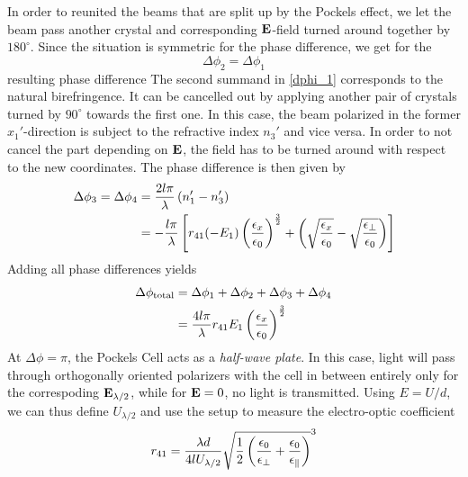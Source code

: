 In order to reunited the beams that are split up by the Pockels effect, 
we let the beam pass another crystal and corresponding $\mathbf{E}$-field 
turned around together by $180^\circ$. 
Since the situation is symmetric for the phase difference, we get for the 
\begin{equation}
    \Delta \phi_2 = \Delta \phi_1
\end{equation}
resulting phase difference  
The second summand in \eqref{dphi_1} corresponds to the natural birefringence. 
It can be cancelled out by applying another pair of crystals turned by 
$90^\circ$ towards the first one. In this case, the beam polarized 
in the former $x_1'$-direction is subject to the refractive index 
$n_3'$ and vice versa. In order to not cancel the part depending on $\mathbf{E}$, 
the field has to be turned around with respect to the new coordinates. 
The phase difference is then given by 
\begin{equation}
    \begin{split}
    \Delta \phi_3 = \Delta \phi_4
    &= \frac{2l \pi}{\lambda} \left(n_1' - n_3' \right) \\
    &= -\frac{l \pi}{\lambda}\left[
    r_{41} (-E_1) \left(\frac{\epsilon_x}{\epsilon_0}\right)^\frac{3}{2} + 
    \left(\sqrt{\frac{\epsilon_x}{\epsilon_0}} - \sqrt{\frac{\epsilon_\perp}{\epsilon_0}}
    \right)
    \right]
   \end{split}
    \label{eq:dphi_34}
\end{equation}
Adding all phase differences yields
\begin{equation}
    \begin{split}
    \Delta \phi_\mathrm{total}  
    &= \Delta \phi_1 + \Delta \phi_2 + \Delta \phi_3 + \Delta \phi_4 \\
    &= \frac{4l \pi}{\lambda} r_{41} E_1 \left(\frac{\epsilon_x}{\epsilon_0}\right)^\frac{3}{2} 
    \end{split}
    \label{eq:dphi_34}
\end{equation}
At $\Delta \phi = \pi$, the Pockels Cell acts as a \emph{half-wave plate}. 
In this case, light will pass through orthogonally oriented polarizers 
with the cell in between entirely only for the correspoding $\mathbf{E}_{\lambda/2}$,
while for $\mathbf{E} = 0$, no light is transmitted. Using $E = U / d$, we can thus 
define $U_{\lambda / 2}$ and use the setup to measure the electro-optic 
coefficient 
\begin{equation}
    r_{41} = \frac{\lambda d}{4 l U_{\lambda / 2}} 
    \sqrt{\frac{1}{2} \left(\frac{\epsilon_0}{\epsilon_\perp} + \frac{\epsilon_0}{\epsilon_\parallel}\right)}^3
    \label{eq:r_41_U}
\end{equation}

